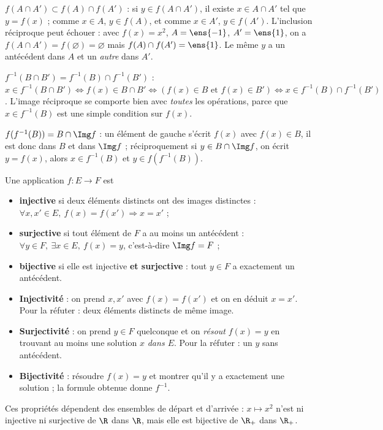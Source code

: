 \begin{preuve}
$f(A\cap A')\subset f(A)\cap f(A')$ : si $y\in f(A\cap A')$, il existe $x\in A\cap A'$ tel que $y=f(x)$ ; comme $x\in A$, $y\in f(A)$, et comme $x\in A'$, $y\in f(A')$.
L'inclusion réciproque peut échouer : avec $f(x)=x^2$, $A=\ens{-1}$, $A'=\ens{1}$, on a $f(A\cap A')=f(\varnothing)=\varnothing$ mais $f(A)\cap f(A')=\ens{1}$. Le même $y$ a un antécédent dans $A$ et un \emph{autre} dans $A'$.

$f^{-1}(B\cap B')=f^{-1}(B)\cap f^{-1}(B')$ : $x\in f^{-1}(B\cap B')\iff f(x)\in B\cap B'\iff (f(x)\in B \text{ et } f(x)\in B')\iff x\in f^{-1}(B)\cap f^{-1}(B')$. L'image réciproque se comporte bien avec \emph{toutes} les opérations, parce que \og $x\in f^{-1}(B)$ \fg{} est une simple condition sur $f(x)$.

$f(f^{-1}(B))=B\cap\Img f$ : un élément de gauche s'écrit $f(x)$ avec $f(x)\in B$, il est donc dans $B$ et dans $\Img f$ ; réciproquement si $y\in B\cap \Img f$, on écrit $y=f(x)$, alors $x\in f^{-1}(B)$ et $y\in f(f^{-1}(B))$.
\end{preuve}
\begin{definition}
Une application $f:E\to F$ est
\begin{itemize}
\item \textbf{injective} si deux éléments distincts ont des images distinctes : $\forall x,x'\in E,\ f(x)=f(x')\Rightarrow x=x'$ ;
\item \textbf{surjective} si tout élément de $F$ a au moins un antécédent : $\forall y\in F,\ \exists x\in E,\ f(x)=y$, c'est-à-dire $\Img f=F$ ;
\item \textbf{bijective} si elle est injective \textbf{et surjective} : tout $y\in F$ a exactement un antécédent.
\end{itemize}
\end{definition}
\begin{methode}
\begin{itemize}
\item \textbf{Injectivité} : on prend $x,x'$ avec $f(x)=f(x')$ et on en déduit $x=x'$. Pour la réfuter : deux éléments distincts de même image.
\item \textbf{Surjectivité} : on prend $y\in F$ quelconque et on \emph{résout} $f(x)=y$ en trouvant au moins une solution $x$ \emph{dans $E$}. Pour la réfuter : un $y$ sans antécédent.
\item \textbf{Bijectivité} : résoudre $f(x)=y$ et montrer qu'il y a exactement une solution ; la formule obtenue donne $f^{-1}$.
\end{itemize}
Ces propriétés dépendent des ensembles de départ et d'arrivée : $x\mapsto x^2$ n'est ni injective ni surjective de $\R$ dans $\R$, mais elle est bijective de $\R_+$ dans $\R_+$.
\end{methode}
